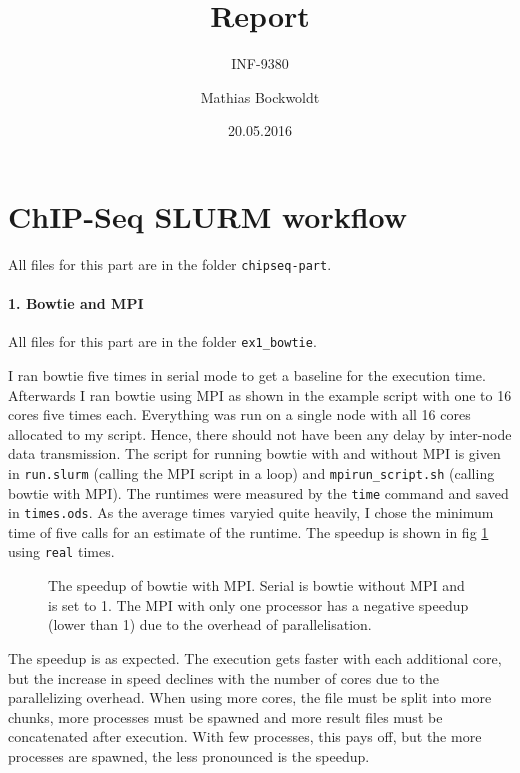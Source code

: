 \documentclass[paper=a4, 12pt]{scrartcl}
\begin{document}
\title{Report}
\subtitle{INF-9380}
\author{Mathias Bockwoldt}
\date{20.05.2016}

\maketitle

\onehalfspacing

\section{ChIP-Seq SLURM workflow}

All files for this part are in the folder \texttt{chipseq-part}.

\paragraph{1. Bowtie and MPI} All files for this part are in the folder \texttt{ex1\_bowtie}.

I ran bowtie five times in serial mode to get a baseline for the execution time. Afterwards I ran bowtie using MPI as shown in the example script with one to 16 cores five times each. Everything was run on a single node with all 16 cores allocated to my script. Hence, there should not have been any delay by inter-node data transmission. The script for running bowtie with and without MPI is given in \texttt{run.slurm} (calling the MPI script in a loop) and \texttt{mpirun\_script.sh} (calling bowtie with MPI). The runtimes were measured by the \texttt{time} command and saved in \texttt{times.ods}. As the average times varyied quite heavily, I chose the minimum time of five calls for an estimate of the runtime. The speedup is shown in fig \ref{fig:chipseq-bowtie} using \texttt{real} times.

\begin{figure}[ht]
  \centering
  \caption{The speedup of bowtie with MPI. Serial is bowtie without MPI and is set to 1. The MPI with only one processor has a negative speedup (lower than 1) due to the overhead of parallelisation.}
  \label{fig:chipseq-bowtie}
\end{figure}

The speedup is as expected. The execution gets faster with each additional core, but the increase in speed declines with the number of cores due to the parallelizing overhead. When using more cores, the file must be split into more chunks, more processes must be spawned and more result files must be concatenated after execution. With few processes, this pays off, but the more processes are spawned, the less pronounced is the speedup.
\end{document}
